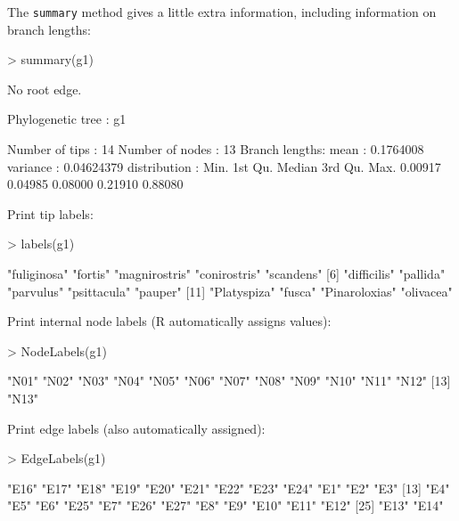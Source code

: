 \documentclass{article}
\newcommand{\code}[1]{{{\tt #1}}}
\begin{document}
The \code{summary} method gives a little extra information, including information on branch lengths:
\begin{Schunk}
\begin{Sinput}
> summary(g1)
\end{Sinput}
\begin{Soutput}
  No root edge.

 Phylogenetic tree : g1 

 Number of tips    : 14 
 Number of nodes   : 13 
 Branch lengths:
        mean         : 0.1764008 
        variance     : 0.04624379 
        distribution :
   Min. 1st Qu.  Median 3rd Qu.    Max. 
0.00917 0.04985 0.08000 0.21910 0.88080 
\end{Soutput}
\end{Schunk}

Print tip labels:
\begin{Schunk}
\begin{Sinput}
> labels(g1)
\end{Sinput}
\begin{Soutput}
 [1] "fuliginosa"   "fortis"       "magnirostris" "conirostris"  "scandens"    
 [6] "difficilis"   "pallida"      "parvulus"     "psittacula"   "pauper"      
[11] "Platyspiza"   "fusca"        "Pinaroloxias" "olivacea"    
\end{Soutput}
\end{Schunk}

Print internal node labels (R automatically assigns values):
\begin{Schunk}
\begin{Sinput}
> NodeLabels(g1)
\end{Sinput}
\begin{Soutput}
 [1] "N01" "N02" "N03" "N04" "N05" "N06" "N07" "N08" "N09" "N10" "N11" "N12"
[13] "N13"
\end{Soutput}
\end{Schunk}

Print edge labels (also automatically assigned):
\begin{Schunk}
\begin{Sinput}
> EdgeLabels(g1)
\end{Sinput}
\begin{Soutput}
 [1] "E16" "E17" "E18" "E19" "E20" "E21" "E22" "E23" "E24" "E1"  "E2"  "E3" 
[13] "E4"  "E5"  "E6"  "E25" "E7"  "E26" "E27" "E8"  "E9"  "E10" "E11" "E12"
[25] "E13" "E14"
\end{Soutput}
\end{Schunk}
\end{document}
